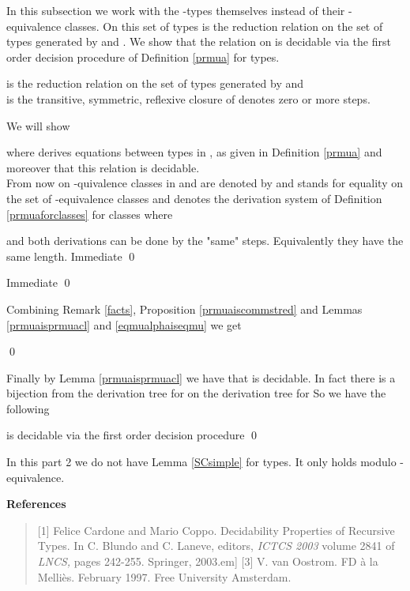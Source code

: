 \documentclass[11pt,aslarticle,xperspectives,bibay3]{asl}
\begin{document}
{In this subsection we work with the -types themselves instead of their -equivalence classes. On this set of types  is the reduction relation on the set of types  generated by  and . We show that the relation  on  is decidable via the first order decision procedure of Definition \ref{prmua} for types.

\bdf  is the reduction relation on the set of types  generated by  and \\  is the transitive, symmetric, reflexive closure of 
  denotes zero or more  steps.
\edf

We will show 

where  derives equations between types in , as given in Definition \ref{prmua} and moreover that this relation is decidable.\\
From now on  -quivalence classes in  and  are denoted by  and   stands for equality on the set  of -equivalence classes  and 
 denotes the derivation system of Definition \ref{prmuaforclasses} for classes  where 

\blem\label{prmuaisprmuacl}  and both derivations can be done by the "same" steps. Equivalently they have the same length.
\elem
\bpf Immediate \qed
\epf

\blem\label{eqmualphaiseqmu} 
\elem
\bpf Immediate \qed
\epf

Combining Remark \ref{facts}, Proposition \ref{prmuaiscommstred} and Lemmas \ref{prmuaisprmuacl} and \ref{eqmualphaiseqmu} we get

\bcor   \qed
\ecor

Finally by Lemma \ref{prmuaisprmuacl} we have that  is decidable. In fact there is a bijection from the derivation tree for  on the derivation tree for  So we have the following

\bth  is decidable via the first order decision procedure  \qed
\eth

\brem In this part 2 we do not have Lemma \ref{SCsimple} for types. It only holds modulo -equivalence.
\erem

\newenvironment{References} {\begin{center}\textbf{References}\end{center} \begin{quote}} {\end{quote}}
\begin{References}
[1] Felice Cardone and Mario Coppo. Decidability Properties of Recursive Types. In C. Blundo and C. Laneve, editors, {\it ICTCS 2003} volume 2841 of {\it LNCS,} pages 242-255. Springer, 2003.\1em]
[3] V. van Oostrom. FD \`a la Melli\`es. February 1997. Free  University Amsterdam.
\end{References}
\end{document}
